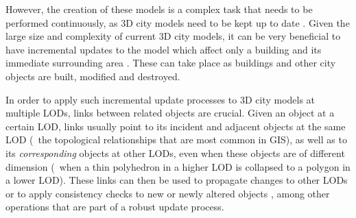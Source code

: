 However, the creation of these models is a complex task that needs to be performed continuously, as 3D city models need to be kept up to date \citep{Zlatanova04,Kolbe05}.
Given the large size and complexity of current 3D city models, it can be very beneficial to have incremental updates to the model which affect only a building and its immediate surrounding area \citep{Dollner06}.
These can take place as buildings and other city objects are built, modified and destroyed.

In order to apply such incremental update processes to 3D city models at multiple LODs, links between related objects are crucial.
Given an object at a certain LOD, links usually point to its incident and adjacent objects at the same LOD (\ie\ the topological relationships that are most common in GIS), as well as to its \emph{corresponding} objects at other LODs, even when these objects are of different dimension (\eg\ when a thin polyhedron in a higher LOD is collapsed to a polygon in a lower LOD).
These links can then be used to propagate changes to other LODs \citep{vanOosterom10} or to apply consistency checks to new or newly altered objects \citep{Groger11a}, among other operations that are part of a robust update process.

